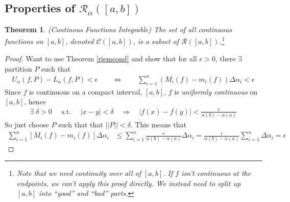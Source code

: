 \documentclass[12pt]{book}
\numberwithin{equation}{section} %
\theoremstyle{plain}
\newtheorem{thm}{Theorem}[section]
\theoremstyle{definition}
\theoremstyle{remark}
\newcommand{\sC}{\mathscr{C}}
\begin{document}
\subsection{Properties of $\mathscr{R}_\alpha([a,b])$}

\begin{thm}\emph{(Continous Functions Integrable)}
\label{contthm}
The set of all continuous functions on $[a,b]$, denoted $\sC([a,b])$, is
a subset of $\mathscr{R}([a,b])$.\footnote{%
  Note that we need continuity over \emph{all} of $[a,b]$. If $f$ isn't
  continuous at the endpoints, we can't apply this proof directly. We
  instead need to split up $[a,b]$ into ``good'' and ``bad'' parts.
}
\end{thm}
\begin{proof}
Want to use Theorem \ref{riemcond} and show that for all
$\epsilon>0$, there $\exists$ partition $P$ such that
\begin{align*}
    U_\alpha(f,P) - L_\alpha(f,P) < \epsilon
    \qquad\iff\qquad
    \sum^n_{i=1} (M_i(f) - m_i(f)) \Delta\alpha_i < \epsilon
\end{align*}
Since $f$ is continuous on a compact interval, $[a,b]$, $f$ is
\emph{uniformly continuous} on $[a,b]$,
hence
\begin{align*}
  \exists \; \delta >0 \quad \text{ s.t. } \quad
      |x - y| < \delta \quad \Rightarrow \quad
      |f(x) - f(y)| < \frac{\epsilon}{\alpha(b)-\alpha(a)}
\end{align*}
So just choose $P$ such that that $||P|| < \delta$.  This means that
\begin{align*}
    \sum^n_{i=1} [M_i(f) - m_i(f)] \Delta\alpha_i &\leq
    \sum^n_{i=1} \frac{\epsilon}{\alpha(b)-\alpha(a)}
        \Delta\alpha_i
    =\frac{\epsilon}{\alpha(b)-\alpha(a)}\sum^n_{i=1}
        \Delta\alpha_i
    = \epsilon
\end{align*}
\end{proof}
\end{document}
